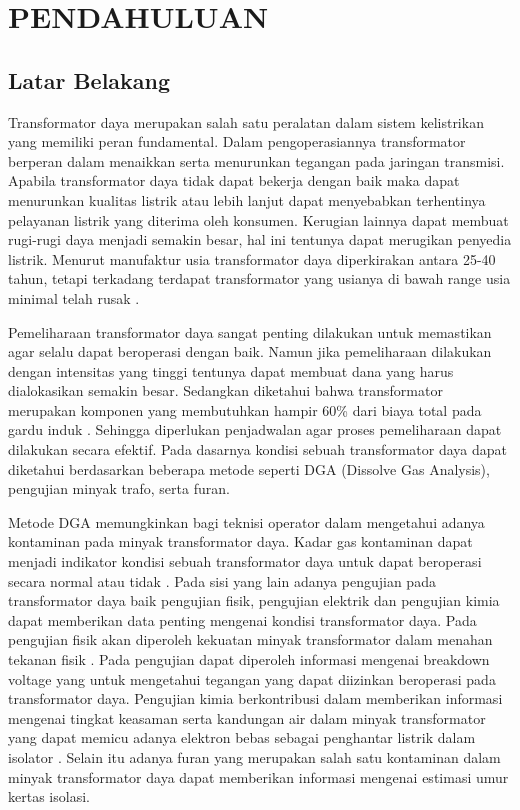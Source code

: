 \chapter{PENDAHULUAN}
\label{BAB1:pendahuluan}

\section{Latar Belakang}
Transformator daya merupakan salah satu peralatan dalam sistem kelistrikan yang memiliki peran fundamental. Dalam pengoperasiannya transformator berperan dalam menaikkan serta menurunkan tegangan pada jaringan transmisi. Apabila transformator daya tidak dapat bekerja dengan baik maka dapat menurunkan kualitas listrik atau lebih lanjut dapat menyebabkan terhentinya pelayanan listrik yang diterima oleh konsumen. Kerugian lainnya dapat membuat rugi-rugi daya menjadi semakin besar, hal ini tentunya dapat merugikan penyedia listrik. Menurut manufaktur usia transformator daya diperkirakan antara 25-40 tahun, tetapi terkadang terdapat transformator yang usianya di bawah range usia minimal telah rusak \cite{jahromi2009approach}.\par

Pemeliharaan transformator daya sangat penting dilakukan untuk memastikan agar selalu dapat beroperasi dengan baik. Namun jika pemeliharaan dilakukan dengan intensitas yang tinggi tentunya dapat membuat dana yang harus dialokasikan semakin besar. Sedangkan diketahui bahwa transformator merupakan komponen yang membutuhkan hampir 60\% dari biaya total pada gardu induk \cite{jahromi2009approach}. Sehingga diperlukan penjadwalan agar proses pemeliharaan dapat dilakukan secara efektif. Pada dasarnya kondisi sebuah transformator daya dapat diketahui berdasarkan beberapa metode seperti DGA (Dissolve Gas Analysis), pengujian minyak trafo, serta furan.\par

Metode DGA memungkinkan bagi teknisi operator dalam mengetahui adanya kontaminan pada minyak transformator daya. Kadar gas kontaminan dapat menjadi indikator kondisi sebuah transformator daya untuk dapat beroperasi secara normal atau tidak \cite{duval1989dissolved}. Pada sisi yang lain adanya pengujian pada transformator daya baik pengujian fisik, pengujian elektrik dan pengujian kimia dapat memberikan data penting mengenai kondisi transformator daya. Pada pengujian fisik akan diperoleh kekuatan minyak transformator dalam menahan tekanan fisik \cite{7076831}. Pada pengujian dapat diperoleh informasi mengenai breakdown voltage yang untuk mengetahui tegangan yang dapat diizinkan beroperasi pada transformator daya. Pengujian kimia berkontribusi dalam memberikan informasi mengenai tingkat keasaman serta kandungan air dalam minyak transformator yang dapat memicu adanya elektron bebas sebagai penghantar listrik dalam isolator \cite{wahab1999novel}. Selain itu adanya furan yang merupakan salah satu kontaminan dalam minyak transformator daya dapat memberikan informasi mengenai estimasi umur kertas isolasi.\par

